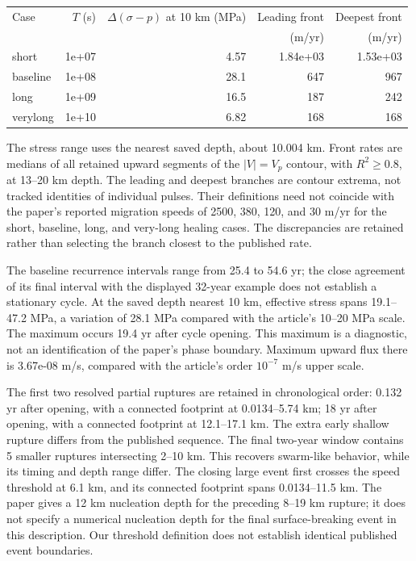 \documentclass[11pt]{article}
\begin{document}
\begin{center}\small
\begin{tabular}{lrrrr}\toprule
Case & $T$ (s) & $\Delta(\sigma-p)$ at 10 km (MPa) & Leading front & Deepest front\\
 & & & (m/yr) & (m/yr)\\\midrule
short & 1e+07 & 4.57 & 1.84e+03 & 1.53e+03\\
baseline & 1e+08 & 28.1 & 647 & 967\\
long & 1e+09 & 16.5 & 187 & 242\\
verylong & 1e+10 & 6.82 & 168 & 168\\
\bottomrule\end{tabular}\end{center}
The stress range uses the nearest saved depth, about 10.004 km. Front rates are
medians of all retained upward segments of the $|V|=V_p$ contour, with $R^2\geq0.8$,
at 13--20 km depth. The leading and deepest branches are contour extrema, not
tracked identities of individual pulses. Their definitions need not coincide
with the paper's reported migration speeds of 2500, 380, 120, and 30 m/yr for the
short, baseline, long, and very-long healing cases. The discrepancies are retained rather than selecting the branch
closest to the published rate.

The baseline recurrence intervals range from 25.4 to 54.6 yr; the close agreement of its final interval with the displayed 32-year example does not establish a stationary cycle. At the saved depth nearest 10 km, effective stress spans 19.1--47.2 MPa, a variation of 28.1 MPa compared with the article's 10--20 MPa scale. The maximum occurs 19.4 yr after cycle opening. This maximum is a diagnostic, not an identification of the paper's phase boundary. Maximum upward flux there is 3.67e-08 m/s, compared with the article's order $10^{-7}$ m/s upper scale.

The first two resolved partial ruptures are retained in chronological order: 0.132 yr after opening, with a connected footprint at 0.0134--5.74 km; 18 yr after opening, with a connected footprint at 12.1--17.1 km. The extra early shallow rupture differs from the published sequence. The final two-year window contains 5 smaller ruptures intersecting 2--10 km. This recovers swarm-like behavior, while its timing and depth range differ. The closing large event first crosses the speed threshold at 6.1 km, and its connected footprint spans 0.0134--11.5 km. The paper gives a 12 km nucleation depth for the preceding 8--19 km rupture; it does not specify a numerical nucleation depth for the final surface-breaking event in this description. Our threshold definition does not establish identical published event boundaries.
\end{document}
